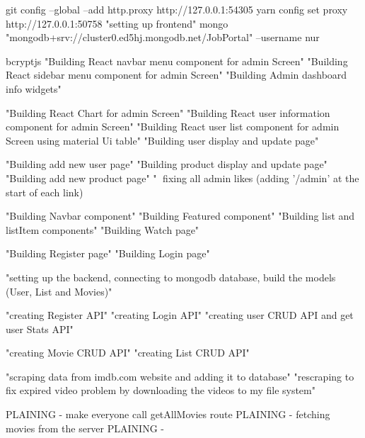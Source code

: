 git config --global --add http.proxy http://127.0.0.1:54305
yarn config set proxy http://127.0.0.1:50758
"setting up frontend"
mongo "mongodb+srv://cluster0.ed5hj.mongodb.net/JobPortal" --username nur

bcryptjs
"Building React navbar menu component for admin Screen"
"Building React sidebar menu component for admin Screen"
"Building Admin dashboard info widgets"

"Building React Chart for admin Screen"
"Building React user information component for admin Screen"
"Building React user list component for admin Screen using material Ui table"
"Building user display and update page"

"Building add new user page"
"Building product display and update page"
"Building add new product page"
"🔨 fixing all admin likes (adding '/admin' at the start of each link)

"Building Navbar component"
"Building Featured component"
"Building list and listItem components"
"Building Watch page"

"Building Register page"
"Building Login page"

"setting up the backend, connecting to mongodb database, build the models (User, List and Movies)"

"creating Register API"
"creating Login API"
"creating user CRUD API and get user Stats API"

"creating Movie CRUD API"
"creating List CRUD API"

"scraping data from imdb.com website and adding it to database"
"rescraping to fix expired video problem by downloading the videos to my file system"

PLAINING - make everyone call getAllMovies route
PLAINING - fetching movies from the server
PLAINING - 